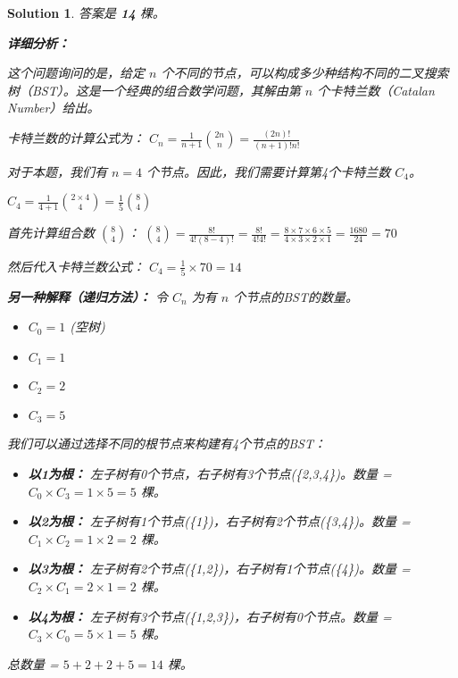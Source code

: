\documentclass[UTF8]{report}
\newtheorem{solution}{Solution}
\theoremstyle{MyLineTheoremStyle} %
\theoremstyle{MyBlockTheoremStyle} %
\theoremstyle{MySubsubsectionStyle} %
\begin{document}
\begin{solution}
答案是 \textbf{14} 棵。

\textbf{详细分析：}

这个问题询问的是，给定 $n$ 个不同的节点，可以构成多少种结构不同的二叉搜索树（BST）。这是一个经典的组合数学问题，其解由第 $n$ 个卡特兰数（Catalan Number）给出。

卡特兰数的计算公式为：
$C_n = \frac{1}{n+1} \binom{2n}{n} = \frac{(2n)!}{(n+1)!n!}$

对于本题，我们有 $n=4$ 个节点。因此，我们需要计算第4个卡特兰数 $C_4$。

$C_4 = \frac{1}{4+1} \binom{2 \times 4}{4} = \frac{1}{5} \binom{8}{4}$

首先计算组合数 $\binom{8}{4}$：
$\binom{8}{4} = \frac{8!}{4!(8-4)!} = \frac{8!}{4!4!} = \frac{8 \times 7 \times 6 \times 5}{4 \times 3 \times 2 \times 1} = \frac{1680}{24} = 70$

然后代入卡特兰数公式：
$C_4 = \frac{1}{5} \times 70 = 14$

\textbf{另一种解释（递归方法）：}
令 $C_n$ 为有 $n$ 个节点的BST的数量。
\begin{itemize}
    \item $C_0 = 1$ (空树)
    \item $C_1 = 1$
    \item $C_2 = 2$
    \item $C_3 = 5$
\end{itemize}
我们可以通过选择不同的根节点来构建有4个节点的BST：
\begin{itemize}
    \item \textbf{以1为根：} 左子树有0个节点，右子树有3个节点(\{2,3,4\})。数量 = $C_0 \times C_3 = 1 \times 5 = 5$ 棵。
    \item \textbf{以2为根：} 左子树有1个节点(\{1\})，右子树有2个节点(\{3,4\})。数量 = $C_1 \times C_2 = 1 \times 2 = 2$ 棵。
    \item \textbf{以3为根：} 左子树有2个节点(\{1,2\})，右子树有1个节点(\{4\})。数量 = $C_2 \times C_1 = 2 \times 1 = 2$ 棵。
    \item \textbf{以4为根：} 左子树有3个节点(\{1,2,3\})，右子树有0个节点。数量 = $C_3 \times C_0 = 5 \times 1 = 5$ 棵。
\end{itemize}
总数量 = $5 + 2 + 2 + 5 = 14$ 棵。
\end{solution}
\end{document}

